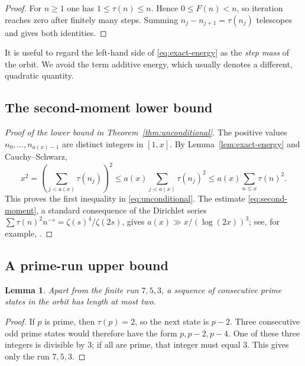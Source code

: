 \documentclass[11pt]{article}
\newtheorem{lemma}[theorem]{Lemma}
\theoremstyle{definition}
\theoremstyle{remark}
\begin{document}
\begin{proof}
For $n\geq1$ one has $1\leq\tau(n)\leq n$.  Hence
$0\leq F(n)<n$, so iteration reaches zero after finitely many steps.
Summing $n_j-n_{j+1}=\tau(n_j)$ telescopes and gives both identities.
\end{proof}

It is useful to regard the left-hand side of \eqref{eq:exact-energy} as
the \emph{step mass} of the orbit.  We avoid the term additive energy,
which usually denotes a different, quadratic quantity.

\subsection{The second-moment lower bound}

\begin{proof}[Proof of the lower bound in Theorem~\ref{thm:unconditional}]
The positive values $n_0,\ldots,n_{a(x)-1}$ are distinct integers in
$[1,x]$.  By Lemma~\ref{lem:exact-energy} and Cauchy--Schwarz,
\[
 x^2
 =\left(\sum_{j<a(x)}\tau(n_j)\right)^2
 \leq a(x)\sum_{j<a(x)}\tau(n_j)^2
 \leq a(x)\sum_{n\leq x}\tau(n)^2.
\]
This proves the first inequality in \eqref{eq:unconditional}.  The
estimate \eqref{eq:second-moment}, a standard consequence of the
Dirichlet series $\sum\tau(n)^2n^{-s}=\zeta(s)^4/\zeta(2s)$, gives
$a(x)\gg x/(\log(2x))^3$; see, for example,
\cite{Apostol1976,Tenenbaum2015,JiaSankaranarayanan2014}.
\end{proof}

\subsection{A prime-run upper bound}

\begin{lemma}\label{lem:prime-runs}
Apart from the finite run $7,5,3$, a sequence of consecutive prime
states in the orbit has length at most two.
\end{lemma}

\begin{proof}
If $p$ is prime, then $\tau(p)=2$, so the next state is $p-2$.
Three consecutive odd prime states would therefore have the form
$p,p-2,p-4$.  One of these three integers is divisible by $3$; if all
are prime, that integer must equal $3$.  This gives only the run
$7,5,3$.
\end{proof}
\end{document}
